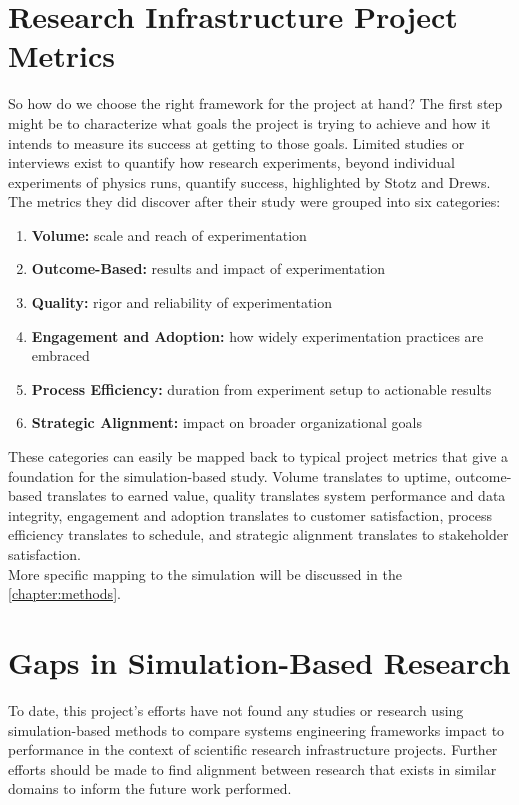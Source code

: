 \section{Research Infrastructure Project Metrics}
\label{sect:metrics}
So how do we choose the right framework for the project at hand?
The first step might be to characterize what goals the project is trying to achieve and how it intends to measure its success at getting to those goals.
Limited studies or interviews exist to quantify how research experiments, beyond individual experiments of physics runs, quantify success, highlighted by Stotz and Drews.\cite{experimentMetrics} The metrics they did discover after their study were grouped into six categories: 
\begin{enumerate}
    \item \textbf{Volume:} scale and reach of experimentation
    \item \textbf{Outcome-Based:} results and impact of experimentation
    \item \textbf{Quality:} rigor and reliability of experimentation
    \item \textbf{Engagement and Adoption:} how widely experimentation practices are embraced
    \item \textbf{Process Efficiency:} duration from experiment setup to actionable results
    \item \textbf{Strategic Alignment:} impact on broader organizational goals
\end{enumerate}

These categories can easily be mapped back to typical project metrics that give a foundation for the simulation-based study. Volume translates to uptime, outcome-based translates to earned value, quality translates system performance and data integrity, engagement and adoption translates to customer satisfaction, process efficiency translates to schedule, and strategic alignment translates to stakeholder satisfaction.\\
More specific mapping to the simulation will be discussed in the \ref{chapter:methods}.
\section{Gaps in Simulation-Based Research}
\label{sect:simulations}
To date, this project's efforts have not found any studies or research using simulation-based methods to compare systems engineering frameworks impact to performance in the context of scientific research infrastructure projects. 
Further efforts should be made to find alignment between research that exists in similar domains to inform the future work performed.